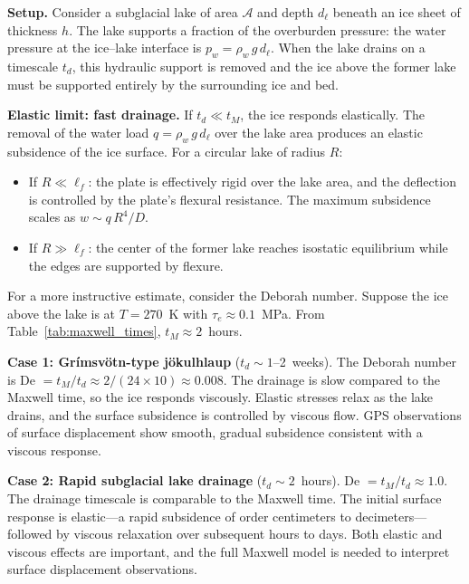 \documentclass[11pt]{article}
\begin{document}
\medskip
\noindent\textbf{Setup.}  Consider a subglacial lake of area $\mathcal{A}$ and depth $d_{\ell}$ beneath an ice sheet of thickness $h$.  The lake supports a fraction of the overburden pressure: the water pressure at the ice--lake interface is $p_w = \rho_w\,g\,d_{\ell}$.  When the lake drains on a timescale $t_d$, this hydraulic support is removed and the ice above the former lake must be supported entirely by the surrounding ice and bed.

\medskip
\noindent\textbf{Elastic limit: fast drainage.}  If $t_d \ll t_M$, the ice responds elastically.  The removal of the water load $q = \rho_w\,g\,d_{\ell}$ over the lake area produces an elastic subsidence of the ice surface.  For a circular lake of radius $R$:
\begin{itemize}
  \item If $R \ll \ell_f$: the plate is effectively rigid over the lake area, and the deflection is controlled by the plate's flexural resistance.  The maximum subsidence scales as $w \sim q\,R^4/D$.
  \item If $R \gg \ell_f$: the center of the former lake reaches isostatic equilibrium while the edges are supported by flexure.
\end{itemize}

\noindent For a more instructive estimate, consider the Deborah number.  Suppose the ice above the lake is at $T = 270$~K with $\tau_e \approx 0.1$~MPa.  From Table~\ref{tab:maxwell_times}, $t_M \approx 2$~hours.

\medskip
\noindent\textbf{Case 1: Gr\'{i}msv\"{o}tn-type j\"{o}kulhlaup} ($t_d \sim 1$--2~weeks).  The Deborah number is De $= t_M / t_d \approx 2/(24 \times 10) \approx 0.008$.  The drainage is slow compared to the Maxwell time, so the ice responds viscously.  Elastic stresses relax as the lake drains, and the surface subsidence is controlled by viscous flow.  GPS observations of surface displacement show smooth, gradual subsidence consistent with a viscous response.

\medskip
\noindent\textbf{Case 2: Rapid subglacial lake drainage} ($t_d \sim 2$~hours).  De $= t_M / t_d \approx 1.0$.  The drainage timescale is comparable to the Maxwell time.  The initial surface response is elastic---a rapid subsidence of order centimeters to decimeters---followed by viscous relaxation over subsequent hours to days.  Both elastic and viscous effects are important, and the full Maxwell model is needed to interpret surface displacement observations.
\end{document}
